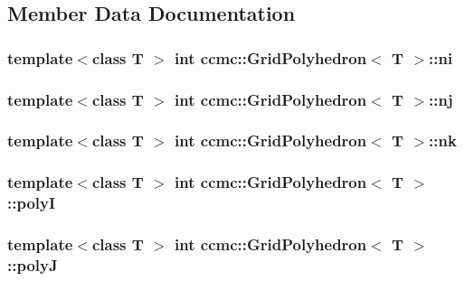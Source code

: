 \subsection{Member Data Documentation}
\hypertarget{classccmc_1_1_grid_polyhedron_aca37d584aa724d6c57cd9d678cda7f8e}{
\subsubsection[{ni}]{\setlength{\rightskip}{0pt plus 5cm}template$<$class T $>$ int {\bf ccmc\-::\-Grid\-Polyhedron}$<$ T $>$\-::ni}}\label{classccmc_1_1_grid_polyhedron_aca37d584aa724d6c57cd9d678cda7f8e}
\hypertarget{classccmc_1_1_grid_polyhedron_ad9d1803b57ac5fc5ef59ee79678e6ea6}{
\subsubsection[{nj}]{\setlength{\rightskip}{0pt plus 5cm}template$<$class T $>$ int {\bf ccmc\-::\-Grid\-Polyhedron}$<$ T $>$\-::nj}}\label{classccmc_1_1_grid_polyhedron_ad9d1803b57ac5fc5ef59ee79678e6ea6}
\hypertarget{classccmc_1_1_grid_polyhedron_a62664743e578a38fa6df7d2773c66d90}{
\subsubsection[{nk}]{\setlength{\rightskip}{0pt plus 5cm}template$<$class T $>$ int {\bf ccmc\-::\-Grid\-Polyhedron}$<$ T $>$\-::nk}}\label{classccmc_1_1_grid_polyhedron_a62664743e578a38fa6df7d2773c66d90}
\hypertarget{classccmc_1_1_grid_polyhedron_a4970eeb2a331105f03304e685f610881}{
\subsubsection[{poly\-I}]{\setlength{\rightskip}{0pt plus 5cm}template$<$class T $>$ int {\bf ccmc\-::\-Grid\-Polyhedron}$<$ T $>$\-::poly\-I}}\label{classccmc_1_1_grid_polyhedron_a4970eeb2a331105f03304e685f610881}
\hypertarget{classccmc_1_1_grid_polyhedron_a4e3afff489393e554662f62364795413}{
\subsubsection[{poly\-J}]{\setlength{\rightskip}{0pt plus 5cm}template$<$class T $>$ int {\bf ccmc\-::\-Grid\-Polyhedron}$<$ T $>$\-::poly\-J}}\label{classccmc_1_1_grid_polyhedron_a4e3afff489393e554662f62364795413}
